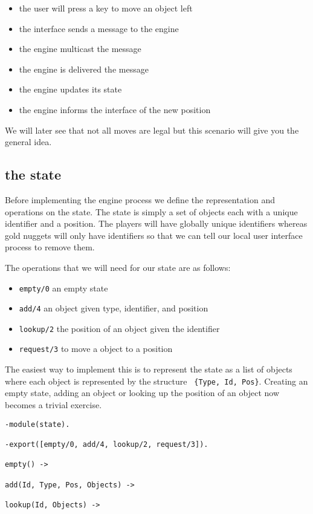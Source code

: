 \documentclass[a4paper,11pt]{article}
\begin{document}
\begin{itemize}
\item the user will press a key to move an object left
\item the interface sends a message to the engine
\item the engine multicast the message
\item the engine is delivered the message
\item the engine updates its state
\item the engine informs the interface of the new position
\end{itemize}

We will later see that not all moves are legal but this scenario will
give you the general idea.

\subsection{the state}

Before implementing the engine process we define the representation
and operations on the state. The state is simply a set of objects each
with a unique identifier and a position. The players will have
globally unique identifiers whereas gold nuggets will only have
identifiers so that we can tell our local user interface process to remove them.

The operations that we will need for our state are as follows:

\begin{itemize} 
\item {\tt empty/0} an empty state
\item {\tt add/4} an object given type, identifier, and position
\item {\tt lookup/2} the position of an object given the identifier
\item {\tt request/3} to move a object to a position
\end{itemize}

The easiest way to implement this is to represent the state as a list
of objects where each object is represented by the structure {\tt
\{Type, Id, Pos\}}. Creating an empty state, adding an object or
looking up the position of an object now becomes a trivial exercise.

\begin{verbatim}
-module(state).

-export([empty/0, add/4, lookup/2, request/3]).

empty() ->
     
add(Id, Type, Pos, Objects) ->

lookup(Id, Objects) ->

\end{verbatim}
\end{document}
